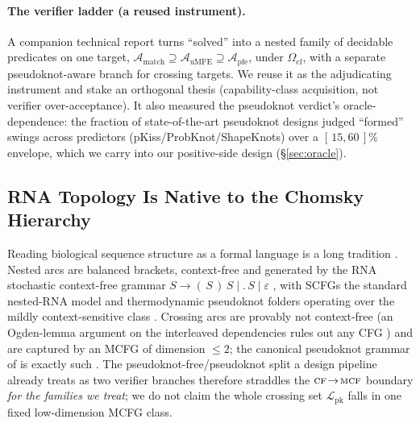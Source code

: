 \documentclass[11pt]{article}
\newcommand{\PK}{\ensuremath{\mathcal{L}_{\mathrm{pk}}}}
\newcommand{\CF}{\textsc{cf}}
\newcommand{\MCF}{\textsc{mcf}}
\newcommand{\Ocf}{\ensuremath{\Omega_{\mathrm{cf}}}}
\newcommand{\match}{\ensuremath{\mathcal{A}_{\mathrm{match}}}}
\newcommand{\umfe}{\ensuremath{\mathcal{A}_{\mathrm{uMFE}}}}
\newcommand{\pfe}{\ensuremath{\mathcal{A}_{\mathrm{pfe}}}}
\newcommand{\citecompanion}{\citep{verifiereconomicsanon}}
\newcommand{\Ourcompanion}{A companion technical report}
\newcommand{\citecompanion}{\citep{verifiereconomics}}
\newcommand{\Ourcompanion}{Our companion work}
\begin{document}
\paragraph{The verifier ladder (a reused instrument).} \Ourcompanion{} \citecompanion{} turns
``solved'' into a nested family of decidable predicates on one target,
$\match\supseteq\umfe\supseteq\pfe$, under \Ocf, with a separate pseudoknot-aware branch for crossing
targets. We reuse it as the adjudicating instrument and stake an orthogonal thesis (capability-class
acquisition, not verifier over-acceptance). It also measured the pseudoknot verdict's oracle-dependence: the
fraction of state-of-the-art pseudoknot designs judged ``formed'' swings across predictors
(pKiss/ProbKnot/ShapeKnots) over a $[\,15,60\,]\%$ envelope, which we carry into our positive-side design
(\S\ref{sec:oracle}).

\subsection{RNA Topology Is Native to the Chomsky Hierarchy}\label{sec:cf}
Reading biological sequence structure as a formal language is a long tradition \citep{searls1992,searls2002}.
Nested arcs are balanced brackets, context-free and generated by the RNA stochastic context-free grammar
$S\to(\,S\,)\,S\mid\mathord{.}\,S\mid\varepsilon$ \citep{rivaseddy2000,durbin1998}, with SCFGs the standard
nested-RNA model \citep{sakakibara1994,knudsenhein1999,dowelleddy2004} and thermodynamic pseudoknot folders
operating over the mildly context-sensitive class \citep{reedergiegerich2004}. Crossing arcs are provably not
context-free (an Ogden-lemma argument on the interleaved dependencies rules out any CFG \citep{nebelweinberg})
and are captured by an MCFG of dimension $\le 2$; the canonical pseudoknot grammar of \citet{rivaseddy2000} is
exactly such \citep{katosekikasami2006}. The pseudoknot-free/pseudoknot split a design pipeline already treats
as two verifier branches therefore straddles the $\CF\!\to\!\MCF$ boundary \emph{for the families we treat}; we do not claim the whole crossing set $\PK$ falls in one
fixed low-dimension MCFG
class.
\end{document}
